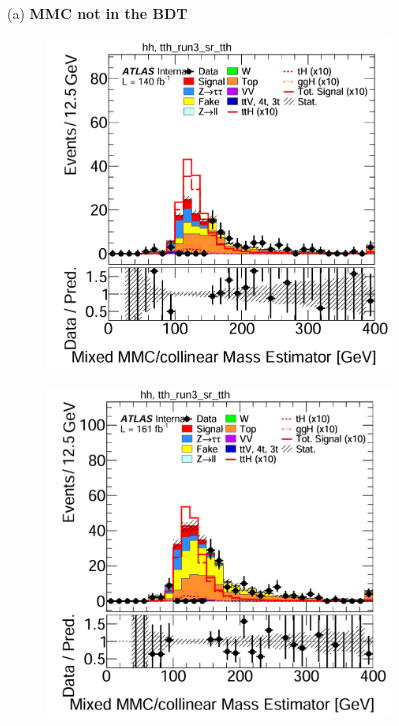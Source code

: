 \begin{figure}[htbp]
\begin{subfigure}[t]{0.45\textwidth}
  \end{subfigure}

  \vspace{0.2cm}
  \begin{minipage}{\textwidth}
    \centering
    \small {(a) \textbf{MMC not in the BDT}}
  \end{minipage}

  \vspace{0.5cm}

  \begin{subfigure}[t]{0.45\textwidth}
    \centering
    \includegraphics[width=\linewidth]{images/mmc_th_tth/run_2_w_mmc_tth.png}
  \end{subfigure}
  \hfill
  \begin{subfigure}[t]{0.45\textwidth}
    \centering
    \includegraphics[width=\linewidth]{images/mmc_th_tth/run_3_w_mmc_tth.png}

\end{subfigure}
\end{figure}
